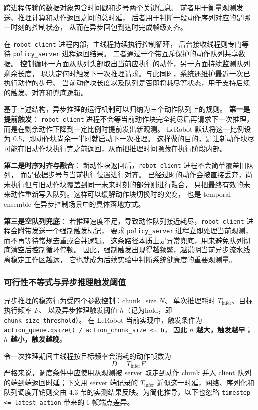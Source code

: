 跨进程传输的数据对象包含时间戳和步号两个关键信息。
前者用于衡量观测发送、推理计算和动作返回之间的总时延，
后者用于判断一段动作序列对应的是哪一时刻的控制状态，
从而在异步回包到达时完成帧级对齐。

在 \texttt{robot\_client} 进程内部，主线程持续执行控制循环，
后台接收线程则专门等待 \texttt{policy\_server} 进程返回结果。
二者通过一个带互斥保护的动作队列共享数据。
控制循环一方面从队列头部取出当前应执行的动作，另一方面持续监测队列剩余长度，
以决定何时触发下一次推理请求。与此同时，系统还维护最近一次已执行动作的步号、
当前动作块长度以及队列是否即将耗尽等状态，用于支持后续的触发、对齐和兜底逻辑。

基于上述结构，异步推理的运行机制可以归纳为三个动作队列上的规则。
\textbf{第一是提前触发}：
\texttt{robot\_client} 进程不会等当前动作块完全耗尽后再请求下一次推理，
而是在剩余动作下降到一定比例时提前发出新观测。
LeRobot 默认将这一比例设为 0.5，即动作块尚余一半时就启动下一次推理。
这样做的目的，是让新动作块尽可能在旧动作块执行完之前返回，从而把推理时间隐藏在执行阶段内部。

\textbf{第二是时序对齐与融合}：
新动作块返回后，\texttt{robot\_client} 进程不会简单覆盖旧队列，
而是依据步号与当前执行位置进行对齐。
已经过时的动作会被直接丢弃，尚未执行但与旧动作块覆盖到同一未来时刻的部分则进行融合，
只把最终有效的未来动作重新写入队列。这样可以缓解动作块切换时的突变，
也是 temporal ensemble 在异步控制场景中的具体落地方式。

\textbf{第三是空队列兜底}：
若推理速度不足，导致动作队列接近耗尽，\texttt{robot\_client} 进程会附带发送一个强制触发标记，
要求 \texttt{policy\_server} 进程立即处理当前观测，而不再等待常规去重或合并逻辑。
这条路径本质上是异常兜底，用来避免队列彻底清空后控制循环停顿。
因此，强制触发出现得越频繁，越说明当前异步流水线离稳定工作区越远，
它也就成为后续实验中判断系统健康度的重要观测量。

\subsubsection{可行性不等式与异步推理触发阈值}\label{sec:async-inf-inequality}

异步推理的稳态行为受四个参数控制：chunk\_size $N$、
单次推理耗时 $T_{\text{infer}}$、目标执行频率 $F$、
以及异步推理触发阈值 $h$（记为hold，即 \texttt{chunk\_size\_threshold}）。
在 LeRobot 当前实现中，触发条件为
\texttt{action\_queue.qsize() / action\_chunk\_size <= h}，
因此 \textbf{$h$ 越大，触发越早；$h$ 越小，触发越晚}。

令一次推理期间主线程按目标频率会消耗的动作帧数为
\begin{equation}
  D = T_{\text{infer}}F.
\end{equation}
严格来说，调度条件中应使用从观测被 server 取走到动作 chunk
并入 client 队列的端到端返回时延；下文用 server 端记录的
$T_{\text{infer}}$ 近似这一时延，网络、序列化和队列调度开销则交由
4.3 节的实测结果反映。为简化推导，以下也忽略
\texttt{timestep <= latest\_action} 带来的 1 帧端点差异。


